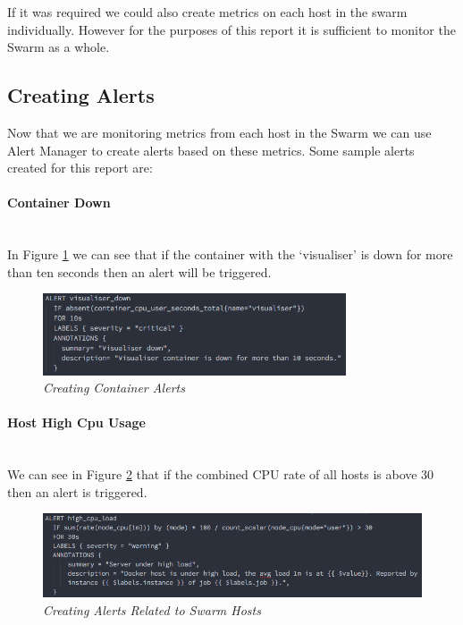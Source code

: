 If it was required we could also create metrics on each host in the swarm individually. However for the purposes of this report it is sufficient to monitor the Swarm as a whole.

\subsection{Creating Alerts}
Now that we are monitoring metrics from each host in the Swarm we can use Alert Manager to create alerts based on these metrics. Some sample alerts created for this report are:

\paragraph{Container Down}\mbox{}\\
In Figure \ref{fig:visualiser-down} we can see that if the container with the `visualiser' is down for more than ten seconds then an alert will be triggered. 
\begin{figure}[!h]
	\centering
	\includegraphics*[width=0.8\textwidth]{components/images/visualiser-down}
	\caption{\em Creating Container Alerts}
	\label{fig:visualiser-down}
\end{figure}

\paragraph{Host High Cpu Usage}\mbox{}\\
We can see in Figure \ref{fig:host-alert} that if the combined CPU rate of all hosts is above 30 then an alert is triggered. 
\begin{figure}[!h]
	\centering
	\includegraphics*[width=\textwidth]{components/images/host-alert}
	\caption{\em Creating Alerts Related to Swarm Hosts}
	\label{fig:host-alert}
\end{figure}

